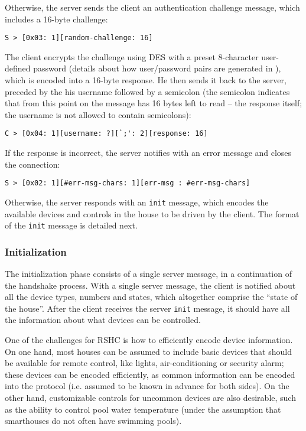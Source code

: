 \noindent
Otherwise, the server sends the client an authentication challenge message, which includes a 16-byte challenge:

\begin{verbatim}
S > [0x03: 1][random-challenge: 16]
\end{verbatim}

\noindent
The client encrypts the challenge using DES with a preset 8-character user-defined password (details about how user/password pairs are generated in ), which is encoded into a 16-byte response. He then sends it back to the server, preceded by the his username followed by a semicolon (the semicolon indicates that from this point on the message has 16 bytes left to read -- the response itself; the username is not allowed to contain semicolons):

\begin{verbatim}
C > [0x04: 1][username: ?][`;': 2][response: 16]
\end{verbatim}

\noindent
If the response is incorrect, the server notifies with an error message and closes the connection:
\begin{verbatim}
S > [0x02: 1][#err-msg-chars: 1][err-msg : #err-msg-chars]
\end{verbatim}

\noindent
Otherwise, the server responds with an {\tt init} message, which encodes the available devices and controls in the house to be driven by the client. The format of the {\tt init} message is detailed next.

\subsubsection{Initialization}
\label{sec:pdus:pdu:init}

The initialization phase consists of a single server message, in a continuation of the handshake process. With a single server message, the client is notified about all the device types, numbers and states, which altogether comprise the ``state of the house''. After the client receives the server {\tt init} message, it should have all the information about what devices can be controlled.

One of the challenges for RSHC is how to efficiently encode device information. On one hand, most houses can be assumed to include basic devices that should be available for remote control, like lights, air-conditioning or security alarm; these devices can be encoded efficiently, as common information can be encoded into the protocol (i.e. assumed to be known in advance for both sides). On the other hand, customizable controls for uncommon devices are also desirable, such as the ability to control pool water temperature (under the assumption that smarthouses do not often have swimming pools).

